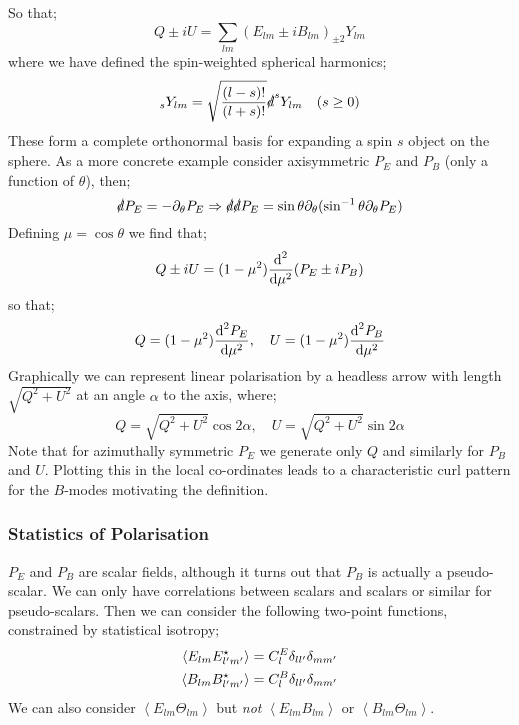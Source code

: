 So that;
\begin{equation}
Q \pm iU = \sum_{lm}{(E_{lm}\pm iB_{lm}) _{\pm2}Y_{lm}}
\end{equation}
where we have defined the spin-weighted spherical harmonics;
\begin{equation*}
_{s}Y_{lm} = \sqrt{\frac{(l - s)!}{(l + s)!}}\slashed{d}^{s}Y_{lm}\quad (s \geq 0)
\end{equation*}
These form a complete orthonormal basis for expanding a spin $s$ object on the sphere. As a more concrete example consider axisymmetric $P_E$ and $P_B$ (only a function of $\theta$), then;
\begin{equation*}
\slashed{d}P_E = -\partial_\theta P_E \Rightarrow \slashed{d}\slashed{d} P_E = \sin\theta \partial_\theta (\sin^{-1}\theta \partial_\theta P_E)
\end{equation*}
Defining $\mu = \cos \theta$ we find that;
\begin{equation*}
Q \pm i U = (1 - \mu^2) \frac{\text{d}^2}{\text{d} \mu^2} (P_E \pm i P_B)
\end{equation*}
so that;
\begin{equation}
Q = (1 - \mu^2)\frac{\text{d}^2 P_E}{\text{d} \mu^2}, \quad U = (1 - \mu^2)\frac{\text{d}^2 P_B}{\text{d} \mu^2}
\end{equation}
Graphically we can represent linear polarisation by a headless arrow with length $\sqrt{Q^2 + U^2}$ at an angle $\alpha$ to the axis, where;\footnotemark
{}
\begin{equation*}
Q = \sqrt{Q^2 + U^2}\cos 2\alpha, \quad U = \sqrt{Q^2 + U^2}\sin 2\alpha
\end{equation*}
Note that for azimuthally symmetric $P_E$ we generate only $Q$ and similarly for $P_B$ and $U$. Plotting this in the local co-ordinates leads to a characteristic curl pattern for the $B$-modes motivating the definition.
\subsubsection{Statistics of Polarisation}
$P_E$ and $P_B$ are scalar fields, although it turns out that $P_B$ is actually a pseudo-scalar. We can only have correlations between scalars and scalars or similar for pseudo-scalars. Then we can consider the following two-point functions, constrained by statistical isotropy;
\begin{align*}
\left< E_{lm}E^{\star}_{l\pr m\pr} \right> &= C_l^{E} \delta_{l l\pr}\delta_{m m\pr} \\
\left< B_{lm}B^{\star}_{l\pr m\pr} \right> &= C_l^{B} \delta_{l l\pr}\delta_{m m\pr}
\end{align*}
We can also consider $\left< E_{lm}\Theta_{lm} \right>$ but \emph{not} $\left< E_{lm}B_{lm} \right>$ or $\left< B_{lm}\Theta_{lm} \right>$.
